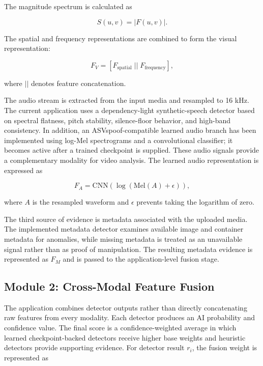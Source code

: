 \documentclass[conference]{IEEEtran}
\begin{document}
The magnitude spectrum is calculated as

\begin{equation}
S(u,v)=|F(u,v)|.
\end{equation}

The spatial and frequency representations are combined to form the visual representation:

\begin{equation}
F_V=[F_{\mathrm{spatial}}\;||\;F_{\mathrm{frequency}}],
\end{equation}

where $||$ denotes feature concatenation.

The audio stream is extracted from the input media and resampled to 16 kHz. The current application uses a dependency-light synthetic-speech detector based on spectral flatness, pitch stability, silence-floor behavior, and high-band consistency. In addition, an ASVspoof-compatible learned audio branch has been implemented using log-Mel spectrograms and a convolutional classifier; it becomes active after a trained checkpoint is supplied. These audio signals provide a complementary modality for video analysis. The learned audio representation is expressed as

\begin{equation}
F_A=\mathrm{CNN}(\log(\mathrm{Mel}(A)+\epsilon)),
\end{equation}

where $A$ is the resampled waveform and $\epsilon$ prevents taking the logarithm of zero.

The third source of evidence is metadata associated with the uploaded media. The implemented metadata detector examines available image and container metadata for anomalies, while missing metadata is treated as an unavailable signal rather than as proof of manipulation. The resulting metadata evidence is represented as $F_M$ and is passed to the application-level fusion stage.

\subsection{Module 2: Cross-Modal Feature Fusion}

The application combines detector outputs rather than directly concatenating raw features from every modality. Each detector produces an AI probability and confidence value. The final score is a confidence-weighted average in which learned checkpoint-backed detectors receive higher base weights and heuristic detectors provide supporting evidence. For detector result $r_i$, the fusion weight is represented as
\end{document}
